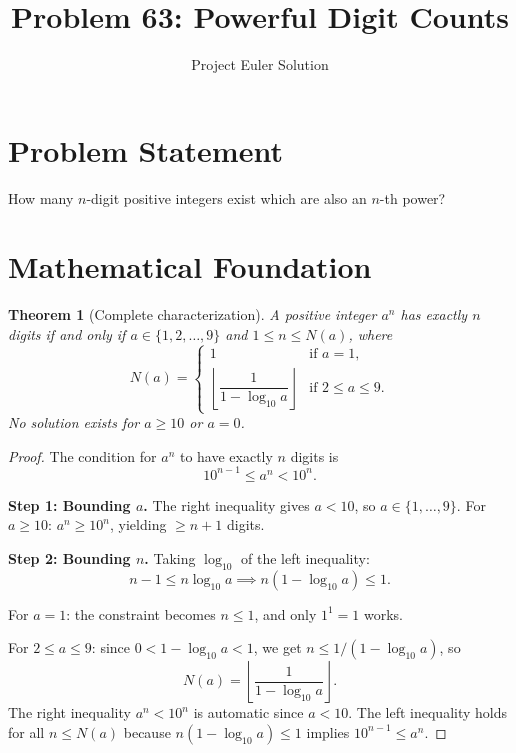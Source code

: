 \documentclass[12pt,a4paper]{article}
\title{Problem 63: Powerful Digit Counts}
\author{Project Euler Solution}
\date{}
\newtheorem{theorem}{Theorem}
\begin{document}
\maketitle

\section{Problem Statement}

How many $n$-digit positive integers exist which are also an $n$-th power?

\section{Mathematical Foundation}

\begin{theorem}[Complete characterization]
A positive integer $a^n$ has exactly $n$ digits if and only if $a \in \{1, 2, \ldots, 9\}$ and $1 \le n \le N(a)$, where
\[
N(a) = \begin{cases} 1 & \text{if } a = 1, \\ \left\lfloor \dfrac{1}{1 - \log_{10} a} \right\rfloor & \text{if } 2 \le a \le 9. \end{cases}
\]
No solution exists for $a \ge 10$ or $a = 0$.
\end{theorem}

\begin{proof}
The condition for $a^n$ to have exactly $n$ digits is
\[
10^{n-1} \le a^n < 10^n. \tag{$\star$}
\]

\textbf{Step 1: Bounding $a$.} The right inequality gives $a < 10$, so $a \in \{1, \ldots, 9\}$. For $a \ge 10$: $a^n \ge 10^n$, yielding $\ge n+1$ digits.

\textbf{Step 2: Bounding $n$.} Taking $\log_{10}$ of the left inequality:
\[
n - 1 \le n \log_{10} a \implies n(1 - \log_{10} a) \le 1.
\]

For $a = 1$: the constraint becomes $n \le 1$, and only $1^1 = 1$ works.

For $2 \le a \le 9$: since $0 < 1 - \log_{10} a < 1$, we get $n \le 1/(1 - \log_{10} a)$, so
\[
N(a) = \left\lfloor \frac{1}{1 - \log_{10} a} \right\rfloor.
\]
The right inequality $a^n < 10^n$ is automatic since $a < 10$. The left inequality holds for all $n \le N(a)$ because $n(1 - \log_{10} a) \le 1$ implies $10^{n-1} \le a^n$.
\end{proof}
\end{document}
